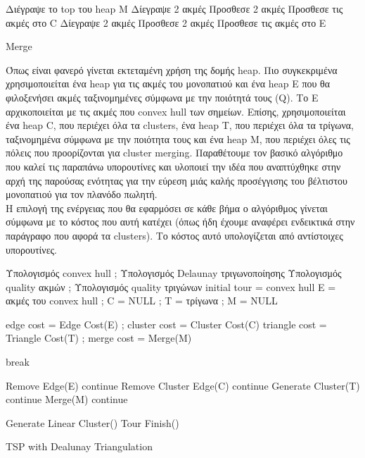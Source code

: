 \documentclass[oneside,12pt]{book}
\theoremstyle{definition}
\begin{document}
\newpage

\begin{algorithm}[H]
	\SetAlgoLined
	
	Διέγραψε το top του heap Μ \;
	{Δίεγραψε 2 ακμές \;
	Προσθεσε 2 ακμές \;
	Προσθεσε τις ακμές στο C \;}
	\Else
	{Δίεγραψε 2 ακμές \;
	Προσθεσε 2 ακμές \;
	Προσθεσε τις ακμές στο Ε \;}
	
	\caption{Merge}
\end{algorithm}

Όπως είναι φανερό γίνεται εκτεταμένη χρήση της δομής heap. Πιο συγκεκριμένα χρησιμοποιείται ένα heap για τις ακμές του μονοπατιού και ένα heap Ε που θα φιλοξενήσει ακμές ταξινομημένες σύμφωνα με την ποιότητά τους (Q). Το Ε αρχικοποιείται με τις ακμές που convex hull των σημείων. Επίσης, χρησιμοποιείται ένα heap C, που περιέχει όλα τα clusters, ένα heap T, που περιέχει όλα τα τρίγωνα, ταξινομημένα σύμφωνα με την ποιότητα τους και ένα heap M, που περιέχει όλες τις πόλεις που προορίζονται για cluster merging. Παραθέτουμε τον βασικό αλγόριθμο που καλεί τις παραπάνω υπορουτίνες και υλοποιεί την ιδέα που αναπτύχθηκε στην αρχή της παρούσας ενότητας για την εύρεση μιάς καλής προσέγγισης του βέλτιστου μονοπατιού για τον πλανόδο πωλητή. \\

Η επιλογή της ενέργειας που θα εφαρμόσει σε κάθε βήμα ο αλγόριθμος γίνεται σύμφωνα με το κόστος που αυτή κατέχει (όπως ήδη έχουμε αναφέρει ενδεικτικά στην παράγραφο που αφορά τα clusters). Το κόστος αυτό υπολογίζεται από αντίστοιχες υπορουτίνες. \\

\begin{algorithm}[H]
	\SetAlgoLined

	Υπολογισμός convex hull ;	
	Υπολογισμός Delaunay τριγωνοποίησης \;
	Υπολογισμός quality ακμών ;
	Υπολογισμός quality τριγώνων \;
	initial tour = convex hull \;
	Ε = ακμές του convex hull ;
	C = NULL ;
	T = τρίγωνα ;
	M = NULL \;
	{edge cost = Edge Cost(E) ;
	cluster cost = Cluster Cost(C) \;
	triangle cost = Triangle Cost(T) ;
	merge cost = Merge(M) \;

	{break \;}
	
	{Remove Edge(E) \;
	continue \;}
	{Remove Cluster Edge(C) \;
	continue \;}
	{Generate Cluster(T) \;
	continue \;}
	{Merge(M) \;
	continue \;}}	

	Generate Linear Cluster() \;
	Tour Finish() \;
	
	\caption{TSP with Dealunay Triangulation}
\end{algorithm}
\end{document}

